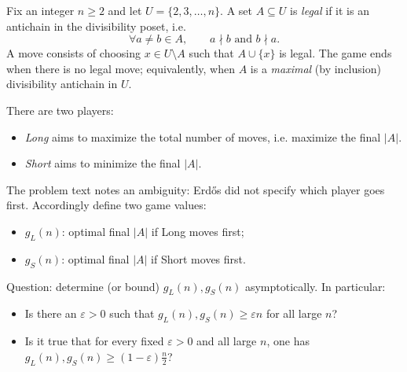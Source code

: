 Fix an integer $n\ge 2$ and let $U=\{2,3,\dots,n\}$.
A set $A\subseteq U$ is \emph{legal} if it is an antichain in the divisibility poset, i.e.
\[
\forall a\neq b\in A,\qquad a\nmid b\text{ and }b\nmid a.
\]
A move consists of choosing $x\in U\setminus A$ such that $A\cup\{x\}$ is legal.
The game ends when there is no legal move; equivalently, when $A$ is a \emph{maximal} (by inclusion) divisibility antichain in $U$.

There are two players:
\begin{itemize}
\item \emph{Long} aims to maximize the total number of moves, i.e. maximize the final $|A|$.
\item \emph{Short} aims to minimize the final $|A|$.
\end{itemize}

The problem text notes an ambiguity: Erd\H{o}s did not specify which player goes first.
Accordingly define two game values:
\begin{itemize}
\item $g_L(n)$: optimal final $|A|$ if Long moves first;
\item $g_S(n)$: optimal final $|A|$ if Short moves first.
\end{itemize}

Question: determine (or bound) $g_L(n),g_S(n)$ asymptotically. In particular:
\begin{itemize}
\item Is there an $\varepsilon>0$ such that $g_L(n),g_S(n)\ge \varepsilon n$ for all large $n$?
\item Is it true that for every fixed $\varepsilon>0$ and all large $n$, one has $g_L(n),g_S(n)\ge (1-\varepsilon)\frac n2$?
\end{itemize}
